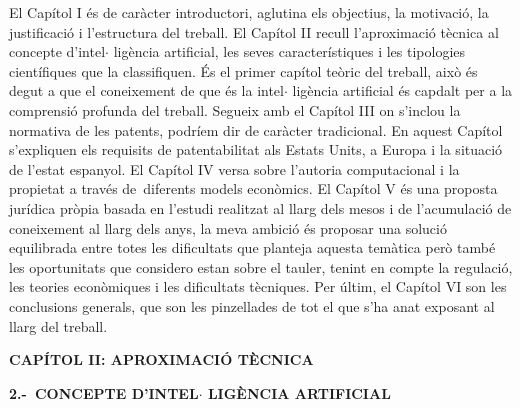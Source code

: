 \documentclass[12pt]{article}
\begin{document}
\vspace{\baselineskip}
\begin{justify}
El Capítol I és de caràcter introductori, aglutina els objectius, la motivació, la justificació i l’estructura del treball. El Capítol II recull l’aproximació tècnica al concepte d’intel$ \cdot $ ligència artificial, les seves característiques i les tipologies científiques que la classifiquen. És el primer capítol teòric del treball, això és degut a que el coneixement de que és la intel$ \cdot $ ligència artificial és capdalt per a la comprensió profunda del treball. Segueix amb el Capítol III on s’inclou la normativa de les patents, podríem dir de caràcter tradicional. En aquest Capítol s’expliquen els requisits de patentabilitat als Estats Units, a Europa i la situació de l’estat espanyol. El Capítol IV versa sobre l’autoria computacional i la propietat a través de\ diferents models econòmics.  El Capítol V és una proposta jurídica pròpia basada en l’estudi realitzat al llarg dels mesos i de l’acumulació de coneixement al llarg dels anys, la meva ambició és proposar una solució equilibrada entre totes les dificultats que planteja aquesta temàtica però també les oportunitats que considero estan sobre el tauler, tenint en compte la regulació, les teories econòmiques i les dificultats tècniques. Per últim, el Capítol VI son les conclusions generals, que son les pinzellades de tot el que s’ha anat exposant al llarg del treball. 
\end{justify}\par


\vspace{\baselineskip}

\vspace{\baselineskip}
\begin{Center}
{\fontsize{16pt}{19.2pt}\selectfont \textbf{CAPÍTOL II: APROXIMACIÓ TÈCNICA}\par}
\end{Center}\par


\vspace{\baselineskip}
\begin{justify}
\textbf{2.-\  CONCEPTE D’INTEL$ \cdot $ LIGÈNCIA ARTIFICIAL}
\end{justify}\par
\end{document}
